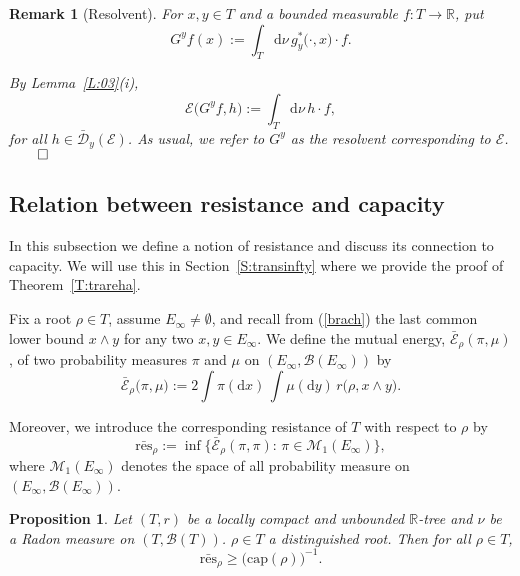 \documentclass[11pt]{amsart}
\numberwithin{equation}{section}
\newtheorem{proposition}[definition]{Proposition}
\newtheorem{remark}[definition]{Remark}
\begin{document}
{\begin{remark}[Resolvent]\rm \label{resolvent} For $x,y \in T$ and a bounded measurable $f: T \rightarrow {{\mathbb R}}$, put
\begin{equation}
\label{e:026}
   G^{y}f(x)
 :=
   \int_T\mathrm{d}\nu\, {g^\ast_y\big(\boldsymbol{\cdot},x\big)}\cdot f.
\end{equation}

By Lemma~\ref{L:03}(i),
\begin{equation}
\label{e:027}
   {\mathcal E}\big(G^{y}f, h\big)
 :=
   \int_T\mathrm{d}\nu\, h\cdot f,
\end{equation}
for all $h\in\bar{\mathcal D}_{y}({\mathcal E})$. As usual, we refer to $G^{y}$ as the resolvent corresponding to ${\mathcal E}$.
{\hfill$\qed$}
\end{remark}{\smallskip}

\subsection{Relation between resistance and capacity}
\label{Sub:resistance}
In this subsection we define a notion of resistance and discuss its connection to capacity. We will use this in Section~\ref{S:transinfty} where we provide the proof of Theorem~\ref{T:trareha}.

Fix a root $\rho\in T$, assume  $E_{\infty} \not = \emptyset$, and recall from (\ref{brach}) the last common lower bound $x\wedge y$ for any two $x,y\in  E_{\infty}$. We define the {{\it} mutual energy},
$\bar{\mathcal E}_\rho(\pi,\mu)$, of two probability measures $\pi$ and $\mu$ on $(E_\infty,\mathcal{B}(E_\infty))$  by
\begin{equation}
\label{e:014b}
   \bar{\mathcal E}_\rho\big(\pi,\mu\big)
 :=
   2\int\pi(\mathrm{d}x)\,\int\mu(\mathrm{d}y)\,r\big(\rho,x\wedge y\big).
\end{equation}

Moreover, we introduce
the corresponding {{\it} resistance} of $T$ {with respect to $\rho$} by
\begin{equation}
\label{e:resis}
   \bar{\mathrm{res}}_{\rho}
 :=
   \inf\big\{\bar{\mathcal E}_\rho(\pi,\pi):\,\pi\in \mathcal
   M_1(E_\infty)\big\},
\end{equation}
where ${\mathcal M}_1(E_\infty)$ denotes the space of all probability measure on $(E_\infty,{\mathcal B}(E_\infty))$.
{\smallskip}

\begin{proposition}
Let $(T,r)$ be a locally compact and unbounded ${{\mathbb R}}$-tree and $\nu$ be a Radon measure on $(T,{\mathcal B}(T))$.  $\rho\in T$ a distinguished root. Then for all $\rho\in T$, \label{P:07}
\begin{equation}\label{P:07.1a}
   \bar{\mathrm{res}}_{\rho}
 \ge
   {\big(\mathrm{cap}(\rho)\big)^{-1}}.
\end{equation}
\end{proposition}{\smallskip}

}
\end{document}

